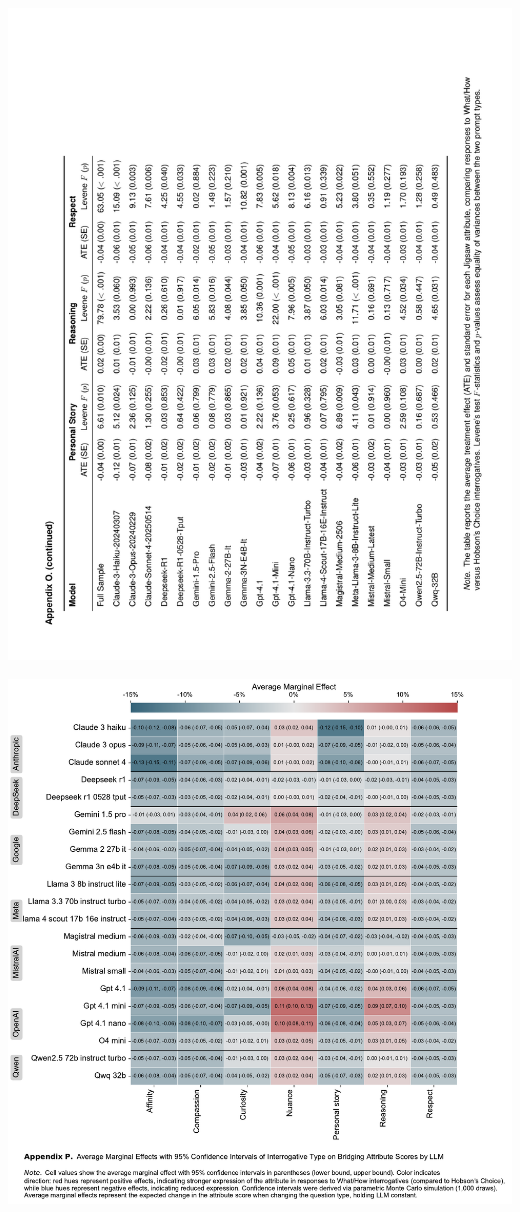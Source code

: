 \documentclass[
  12pt,
]{article}
\begin{document}
\begin{center}\includegraphics{../03_outputs/04_appendices/appendix_o_ii} \end{center}

\begin{center}\includegraphics{../03_outputs/04_appendices/appendix_p} \end{center}
\end{document}
